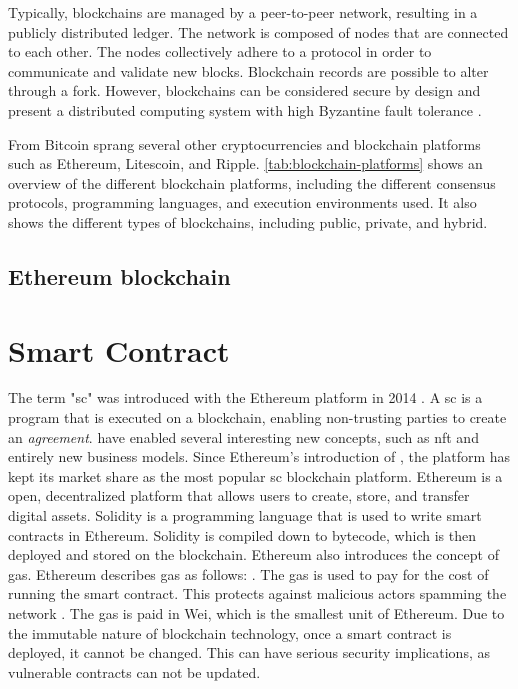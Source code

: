 Typically, blockchains are managed by a peer-to-peer network, resulting in a publicly distributed ledger. The network is composed of nodes that are connected to each other. The nodes collectively adhere to a protocol in order to communicate and validate new blocks. Blockchain records are possible to alter through a \gls{fork}. However, blockchains can be considered secure by design and present a distributed computing system with high Byzantine fault tolerance \cite{sankar2017survey}.

From Bitcoin sprang several other cryptocurrencies and blockchain platforms such as Ethereum, Litescoin, and Ripple. \cref{tab:blockchain-platforms} shows an overview of the different blockchain platforms, including the different consensus protocols, programming languages, and execution environments used. It also shows the different types of blockchains, including public, private, and hybrid. 


\subsection{Ethereum blockchain}
\label{sec:ethereum}


\section{Smart Contract}
\label{sec:smart-contract}

The term "\acrlong{sc}" was introduced with the Ethereum platform in 2014 . A \acrfull{sc} is a program that is executed on a blockchain, enabling non-trusting parties to create an \textit{agreement}.  have enabled several interesting new concepts, such as \acrfull{nft} and entirely new business models. Since Ethereum's introduction of , the platform has kept its market share as the most popular \acrshort{sc} blockchain platform. Ethereum is a open, decentralized platform that allows users to create, store, and transfer digital assets. Solidity is a programming language that is used to write smart contracts in Ethereum. Solidity is compiled down to bytecode, which is then deployed and stored on the blockchain. Ethereum also introduces the concept of gas. Ethereum describes gas as follows: . The gas is used to pay for the cost of running the smart contract. This protects against malicious actors spamming the network \cite{ethereum2021gas}. The gas is paid in Wei, which is the smallest unit of Ethereum. Due to the immutable nature of blockchain technology, once a smart contract is deployed, it cannot be changed. This can have serious security implications, as vulnerable contracts can not be updated.

